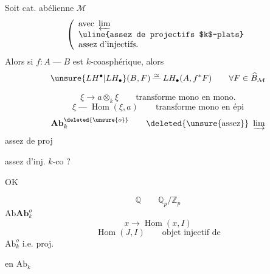Soit cat. abélienne $\mathcal M$
\[
\left(\begin{array}{l}
\text{avec }\varprojlim\\
\text{\uline{assez de projectifs $k$-plats}}\\
\text{assez d'injectifs.}
\end{array}\right.
\]
Alors si $f:A\mathbin{\text{---}}B$ est $k$-coasphérique, alors
\[
\unsure{LH^\bullet|LH_\bullet}(B,F)\overset{\simeq}{\mathbin{\text{---}}}LH_\bullet(A,f^*F)
\qquad\forall F\in\widehat B_{\mathcal M}
\]

\[
\xi\longrightarrow a\otimes_k\xi\qquad\text{transforme mono en mono.}
\]
\margin{$)$}
\[
\xi\mathbin{\text{---}}\operatorname{Hom}(\xi,a)\qquad\text{transforme mono en épi}
\]
\[
\mathbf{Ab}_k^{\deleted{\unsure{o}}}\qquad
\deleted{\text{\unsure{assez}}}\ \varinjlim
\]
assez de proj

assez d'inj. $k$-co ?

OK

\deleted{$\varinjlim$}
\[
\mathbb Q\qquad\mathbb Q_p/\mathbb Z_p
\]
$\mathrm{Ab}$\hfill$\mathbf{Ab}_k^o$
\[
x\longrightarrow\operatorname{Hom}(x,I)
\]
\[
\operatorname{Hom}(J,I)\qquad\text{objet injectif de}
\]
$\mathrm{Ab}_k^o$ i.e. proj.\par
en $\mathrm{Ab}_k$

